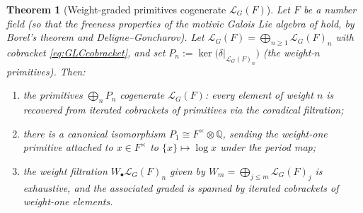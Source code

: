 \documentclass[12pt]{article}
\newtheorem{theorem}{Theorem}[section]
\theoremstyle{definition}
\theoremstyle{remark}
\newcommand{\LG}{\mathcal{L}_{G}}
\newcommand{\cobr}{\delta}
\newcommand{\Qbb}{\mathbb{Q}}
\begin{document}
\begin{theorem}[Weight-graded primitives cogenerate $\LG(F)$]
\label{thm:goncharov-gen}
Let $F$ be a number field (so that the freeness properties of the motivic Galois Lie algebra
of  hold, by Borel's theorem and Deligne--Goncharov). Let
$\LG(F)=\bigoplus_{n\ge 1}\LG(F)_n$ with cobracket \eqref{eq:GLCcobracket}, and set
$P_n:=\ker\!\big(\cobr|_{\LG(F)_n}\big)$ (the weight-$n$ primitives). Then:
\begin{enumerate}[label=\textup{(\alph*)}, leftmargin=2.2em]
\item the primitives $\bigoplus_n P_n$ cogenerate $\LG(F)$: every element of weight $n$ is
recovered from iterated cobrackets of primitives via the coradical filtration;
\item there is a canonical isomorphism $P_1\cong F^\times\otimes\Qbb$, sending the weight-one
primitive attached to $x\in F^\times$ to $\{x\}\mapsto\log x$ under the period map;
\item the weight filtration $W_\bullet\LG(F)_n$ given by $W_m=\bigoplus_{j\le m}\LG(F)_j$ is
exhaustive, and the associated graded is spanned by iterated cobrackets of weight-one
elements.
\end{enumerate}
\end{theorem}
\end{document}
